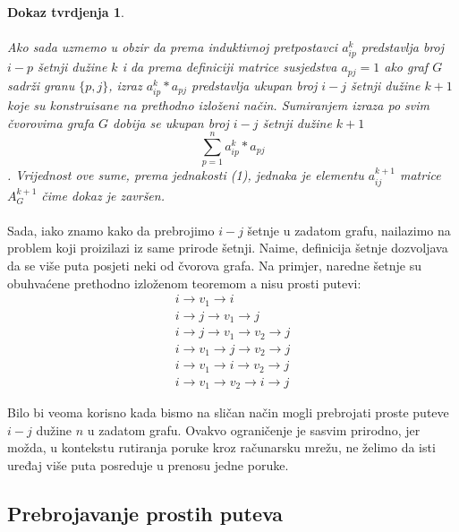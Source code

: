 \documentclass[11pt]{article}
\newtheorem*{custom_proof}{Dokaz tvrdjenja}
\begin{document}
\begin{custom_proof}
			\paragraph{}
			Ako sada uzmemo u obzir da prema induktivnoj pretpostavci $a_{ip}^k$ predstavlja broj $i-p$ šetnji dužine $k$ i da prema definiciji matrice susjedstva $a_{pj}=1$ ako graf $G$ sadrži granu $\{p,j\}$, 
			izraz $a_{ip}^k * a_{pj}$ predstavlja ukupan broj $i-j$ šetnji dužine $k+1$ koje su konstruisane na prethodno izloženi način. 
			Sumiranjem izraza po svim čvorovima grafa $G$ dobija se ukupan broj $i-j$ šetnji dužine $k+1$ 
			\[ \sum_{p=1}^{n} a_{ip}^k * a_{pj} \]. 
			Vrijednost ove sume, prema jednakosti (1), jednaka je elementu $a_{ij}^{k+1}$ matrice $A_G^{k+1}$ čime dokaz je završen.
		\end{custom_proof}
	
		\paragraph{}
		Sada, iako znamo kako da prebrojimo $i-j$ šetnje u zadatom grafu, nailazimo na problem koji proizilazi iz same prirode šetnji. Naime, definicija šetnje dozvoljava da se više puta posjeti neki od čvorova grafa.
		Na primjer, naredne šetnje su obuhvaćene prethodno izloženom teoremom a nisu prosti putevi:
		\[
			\begin{split}
			i \rightarrow v_1 \rightarrow i \\
			i \rightarrow  j \rightarrow v_1 \rightarrow j \\
			i \rightarrow j \rightarrow v_1 \rightarrow v_2 \rightarrow j \\
			i \rightarrow v_1 \rightarrow j \rightarrow v_2 \rightarrow j \\
			i \rightarrow v_1 \rightarrow i \rightarrow v_2 \rightarrow j \\
			i \rightarrow v_1 \rightarrow v_2 \rightarrow i \rightarrow j 
			\end{split}
		\]

		Bilo bi veoma korisno kada bismo na sličan način mogli prebrojati proste puteve $i-j$ dužine $n$ u zadatom grafu. 
		Ovakvo ograničenje je sasvim prirodno, jer možda, u kontekstu rutiranja poruke kroz računarsku mrežu,
		ne želimo da isti uređaj više puta posreduje u prenosu jedne poruke. 
		
		\subsection{Prebrojavanje prostih puteva}
\end{document}

